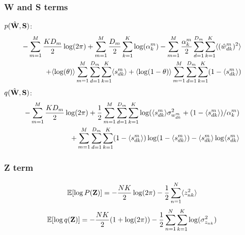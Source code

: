 \documentclass[10pt, a4paper,openany]{report}
\begin{document}
\subsubsection{W and S terms}
$p(\hat{{\bf W}},{\bf S})$:
\begin{align*}
-\sum_{m=1}^{M}\frac{KD_m}{2}\log(2\pi) + \sum_{m=1}^{M}\frac{D_m}{2}\sum_{k=1}^{K} \log(\alpha_k^m) - \sum_{m=1}^{M} \frac{\alpha_k^m}{2} \sum_{d=1}^{D_m} \sum_{k=1}^{K} \langle (\hat{w}_{dk}^m)^2 \rangle \\
+ \langle \log(\theta) \rangle \sum_{m=1}^{M} \sum_{d=1}^{D_m} \sum_{k=1}^{K} \langle s_{dk}^m \rangle + \langle \log(1-\theta) \rangle \sum_{m=1}^{M} \sum_{d=1}^{D_m}\sum_{k=1}^{K} (1- \langle s_{dk}^m \rangle)
\end{align*}
$q(\hat{{\bf W}},{\bf S})$:
\begin{align*}
-\sum_{m=1}^{M}\frac{KD_m}{2}\log(2\pi) + \frac{1}{2}\sum_{m=1}^{M}\sum_{d=1}^{D_m}\sum_{k=1}^{K}\log(\langle s_{dk}^m \rangle \sigma_{w_{dk}^m}^2 + (1-\langle s_{dk}^m \rangle)/\alpha_k^m) \\
+ \sum_{m=1}^{M} \sum_{d=1}^{D_m} \sum_{k=1}^{K} (1-\langle s_{dk}^m \rangle) \log(1 - \langle s_{dk}^m \rangle) - \langle s_{dk}^m \rangle \log \langle s_{dk}^m \rangle
\end{align*}

\subsubsection{Z term}
\[
\mathbb{E} [\log P({\bf Z})] = -\frac{NK}{2}\log(2\pi) -\frac{1}{2} \sum_{n=1}^{N} \langle z_{nk}^2 \rangle
\]
\[
\mathbb{E} [\log q({\bf Z})] = - \frac{NK}{2}(1 + \log(2\pi)) - \frac{1}{2}\sum_{n=1}^{N}\sum_{k=1}^{K} \log(\sigma_{z_{nk}}^2)
\]

\end{document}
